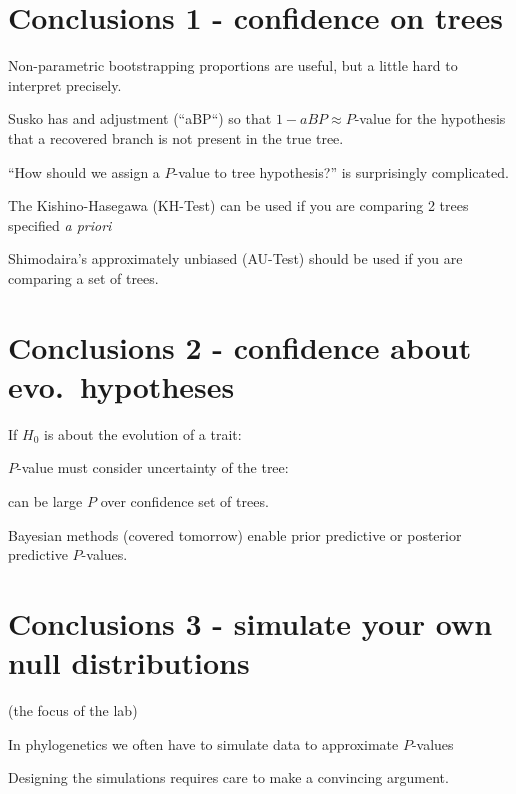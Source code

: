 \myNewSlide
\section*{Conclusions 1 - confidence on trees}\large
\large
\begin{compactenum}
    \item Non-parametric bootstrapping proportions are useful, but a little hard to interpret  precisely.
    \begin{compactitem}
        \item Susko has and adjustment (``aBP``) so that $1 - aBP\approx P$-value for the hypothesis that a recovered branch is not present in the true tree. 
    \end{compactitem}
    \item ``How should we assign a $P$-value to tree hypothesis?'' is surprisingly complicated.
    \begin{compactitem}
        \item The Kishino-Hasegawa (KH-Test) can be used if you are comparing 2 trees specified {\em a priori}
        \item Shimodaira's approximately unbiased (AU-Test) should be used if you are comparing a set of trees.
    \end{compactitem}
\end{compactenum}

\myNewSlide
\section*{Conclusions 2 - confidence about evo.~hypotheses}
If $H_0$ is about the evolution of a trait:
\begin{compactenum}
    \item $P$-value must consider uncertainty of the tree:
    \begin{compactitem}
        \item can be large $P$ over confidence set of trees.
        \item Bayesian methods (covered tomorrow) enable prior predictive or posterior predictive $P$-values.
    \end{compactitem}
\end{compactenum}

\myNewSlide
\section*{Conclusions 3 - simulate your own null distributions}
(the focus of the lab)
\begin{compactenum}
    \item In phylogenetics we often have to simulate data to approximate $P$-values 
    \item Designing the simulations requires care to make a convincing argument.
\end{compactenum}
